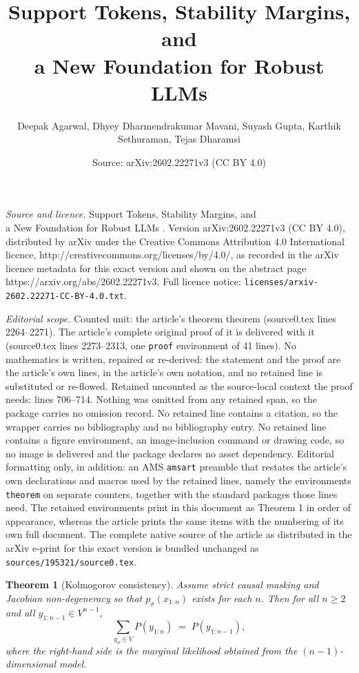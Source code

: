 \documentclass[10pt,a4paper]{amsart}
\title{Support Tokens, Stability Margins, and \\ a New Foundation for Robust LLMs \vspace{1em}}
\author{Deepak Agarwal, Dhyey Dharmendrakumar Mavani, Suyash Gupta, Karthik Sethuraman, Tejas Dharamsi}
\date{Source: arXiv:2602.22271v3 (CC BY 4.0)}
\newtheorem{theorem}{Theorem}
\begin{document}
\maketitle

\noindent\emph{Source and licence.} Support Tokens, Stability Margins, and \\ a New Foundation for Robust LLMs \vspace{1em}. Version arXiv:2602.22271v3 (CC BY 4.0), distributed by arXiv under the Creative Commons Attribution 4.0 International licence, http://creativecommons.org/licenses/by/4.0/, as recorded in the arXiv licence metadata for this exact version and shown on the abstract page https://arxiv.org/abs/2602.22271v3. Full licence notice: \texttt{licenses/arxiv-2602.22271-CC-BY-4.0.txt}.\par\smallskip

\noindent\textit{Editorial scope.} Counted unit: the article's theorem theorem (source0.tex lines 2264--2271). The article's complete original proof of it is delivered with it (source0.tex lines 2273--2313, one \texttt{proof} environment of 41 lines). No mathematics is written, repaired or re-derived: the statement and the proof are the article's own lines, in the article's own notation, and no retained line is substituted or re-flowed.  Retained uncounted as the source-local context the proof needs: lines 706--714.  Nothing was omitted from any retained span, so the package carries no omission record.  No retained line contains a citation, so the wrapper carries no bibliography and no bibliography entry.  No retained line contains a figure environment, an image-inclusion command or drawing code, so no image is delivered and the package declares no asset dependency.  Editorial formatting only, in addition: an AMS \texttt{amsart} preamble that restates the article's own declarations and macros used by the retained lines, namely the environments \texttt{theorem} on separate counters, together with the standard packages those lines need.  The retained environments print in this document as Theorem 1 in order of appearance, whereas the article prints the same items with the numbering of its own full document.  The complete native source of the article as distributed in the arXiv e-print for this exact version is bundled unchanged as \texttt{sources/195321/source0.tex}.
\begin{theorem}[Kolmogorov consistency]
\label{thm:kolmogorov_consistency}
Assume strict causal masking and Jacobian non-degeneracy so that $p_\sigma(x_{1:n})$ exists for each $n$. Then for all $n\ge 2$ and all $y_{1:n-1}\in V^{n-1}$,
\begin{equation}
\sum_{y_n\in V} P(y_{1:n}) \;=\; P(y_{1:n-1}),
\label{eq:kolmogorov_consistency}
\end{equation}
where the right-hand side is the marginal likelihood obtained from the \emph{$(n-1)$-dimensional} model.
\end{theorem}
\end{document}
